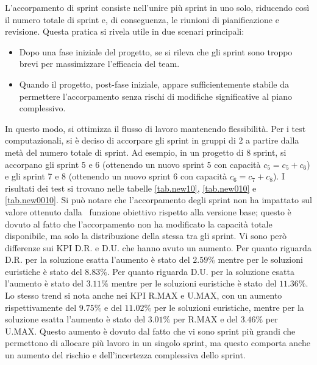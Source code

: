 \documentclass[12pt,a4paper,openright,twoside]{book}
\begin{document}
L'accorpamento di sprint consiste nell'unire più sprint in uno solo, riducendo così il numero totale di sprint e, di conseguenza, le riunioni di pianificazione e revisione. Questa pratica si rivela utile in due scenari principali:
\begin{itemize}
  \item Dopo una fase iniziale del progetto, se si rileva che gli sprint sono troppo brevi per massimizzare l'efficacia del team.
  \item Quando il progetto, post-fase iniziale, appare sufficientemente stabile da permettere l'accorpamento senza rischi di modifiche significative al piano complessivo.
\end{itemize}
In questo modo, si ottimizza il flusso di lavoro mantenendo flessibilità. Per i test computazionali, si è deciso di accorpare gli sprint in gruppi di 2 a partire dalla metà del numero totale di sprint. 
Ad esempio, in un progetto di 8 sprint, si accorpano gli sprint 5 e 6 (ottenendo un nuovo sprint 5 con capacità \( c_5 = c_5 + c_6 \)) e gli sprint 7 e 8 (ottenendo un nuovo sprint 6 con capacità \( c_6 = c_7 + c_8 \)). I risultati dei test si trovano nelle tabelle \ref{tab.new10}, \ref{tab.new010} e \ref{tab.new0010}.
Si può notare che l'accorpamento degli sprint non ha impattato sul valore ottenuto dalla  funzione obiettivo rispetto alla versione base; questo è dovuto al fatto che l'accorpamento non ha modificato la capacità totale disponibile, ma solo la distribuzione della stessa tra gli sprint. Vi sono però differenze sui KPI D.R. e D.U. che hanno avuto un aumento. Per quanto riguarda D.R. per la soluzione esatta l'aumento \`e stato del $2.59\%$ mentre per le soluzioni euristiche \`e stato del $8.83\%$. Per quanto riguarda D.U. per la soluzione esatta l'aumento \`e stato del $3.11\%$ mentre per le soluzioni euristiche \`e stato del $11.36\%$. Lo stesso trend si nota anche nei KPI R.MAX e U.MAX, con un aumento rispettivamente del $9.75\%$ e del $11.02\%$ per le soluzioni euristiche, mentre per la soluzione esatta l'aumento è stato del $3.01\%$ per R.MAX e del $3.46\%$ per U.MAX. Questo aumento \`e dovuto dal fatto che vi sono sprint più grandi che permettono di allocare più lavoro in un singolo sprint, ma questo comporta anche un aumento del rischio e dell'incertezza complessiva dello sprint.
\end{document}
